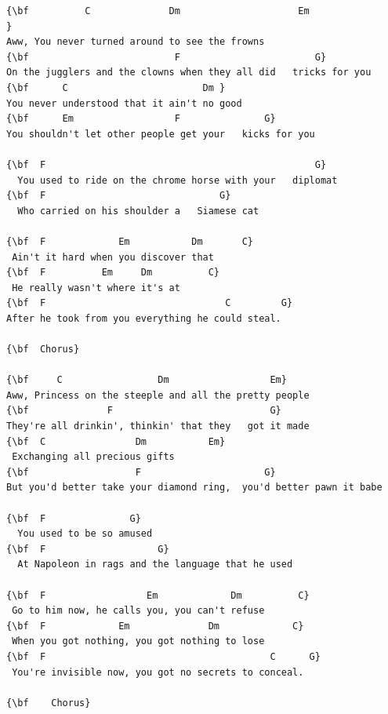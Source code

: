 \documentclass[a4paper]{article}
\begin{document}
\begin{Verbatim}[commandchars=\\\{\}]
{\bf          C              Dm                     Em                                            }
Aww, You never turned around to see the frowns 
{\bf                          F                        G}
On the jugglers and the clowns when they all did   tricks for you
{\bf      C                        Dm }
You never understood that it ain't no good
{\bf      Em                  F               G}
You shouldn't let other people get your   kicks for you

{\bf  F                                                G}
  You used to ride on the chrome horse with your   diplomat
{\bf  F                               G}
  Who carried on his shoulder a   Siamese cat

{\bf  F             Em           Dm       C}
 Ain't it hard when you discover that
{\bf  F          Em     Dm          C}
 He really wasn't where it's at
{\bf  F                                C         G}
After he took from you everything he could steal.

{\bf  Chorus}

{\bf     C                 Dm                  Em}
Aww, Princess on the steeple and all the pretty people
{\bf              F                            G}
They're all drinkin', thinkin' that they   got it made
{\bf  C                Dm           Em}
 Exchanging all precious gifts
{\bf                   F                      G}
But you'd better take your diamond ring,  you'd better pawn it babe

{\bf  F               G}
  You used to be so amused
{\bf  F                    G}
  At Napoleon in rags and the language that he used

{\bf  F                  Em             Dm          C}
 Go to him now, he calls you, you can't refuse
{\bf  F             Em              Dm             C}
 When you got nothing, you got nothing to lose
{\bf  F                                        C      G}
 You're invisible now, you got no secrets to conceal.

{\bf    Chorus}

\end{Verbatim}
\newpage
\end{document}
